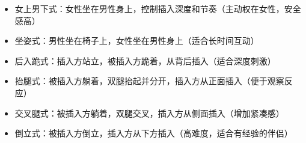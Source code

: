 \documentclass[12pt,UTF8]{ctexbook}
\begin{document}
\begin{itemize}
\begin{itemize}
\begin{itemize}
			\item 女上男下式：女性坐在男性身上，控制插入深度和节奏（主动权在女性，安全感高）
			\item 坐姿式：男性坐在椅子上，女性坐在男性身上（适合长时间互动）
			\item 后入跪式：插入方站立，被插入方跪着，从背后插入（适合深度刺激）
			\item 抬腿式：被插入方躺着，双腿抬起并分开，插入方从正面插入（便于观察反应）
			\item 交叉腿式：被插入方躺着，双腿交叉，插入方从侧面插入（增加紧凑感）
			\item 倒立式：被插入方倒立，插入方从下方插入（高难度，适合有经验的伴侣）
		\end{itemize}
	\end{itemize}
\end{itemize}
\end{document}

